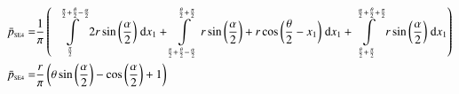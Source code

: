 \begin{align}
    \bar{p}_{\text{\tiny{SE4}}} =&\frac{1}{\pi} \left(\;\;\int\limits_{\frac{\pi}{2}}^{\frac{\pi}{2} + \frac{\theta}{2} - \frac{\alpha}{2}}2 r \sin{\left (\frac{\alpha}{2} \right )}\;\mathrm{d}x_{1}+\int\limits_{\frac{\pi}{2} + \frac{\theta}{2} - \frac{\alpha}{2}}^{\frac{\theta}{2} + \frac{\pi}{2}}r \sin{\left (\frac{\alpha}{2} \right )} + r \cos{\left (\frac{\theta}{2} - x_{1} \right )}\;\mathrm{d}x_{1}+\int\limits_{\frac{\theta}{2} + \frac{\pi}{2}}^{\frac{\alpha}{2} + \frac{\theta}{2} + \frac{\pi}{2}}r \sin{\left (\frac{\alpha}{2} \right )}\;\mathrm{d}x_{1}\right)\label{pSE4Def}\\
    \bar{p}_{\text{\tiny{SE4}}}  =& \frac{r}{\pi} \left(\theta \sin{\left (\frac{\alpha}{2} \right )} - \cos{\left (\frac{\alpha}{2} \right )} + 1\right)\label{pSE4Sln}
\end{align}